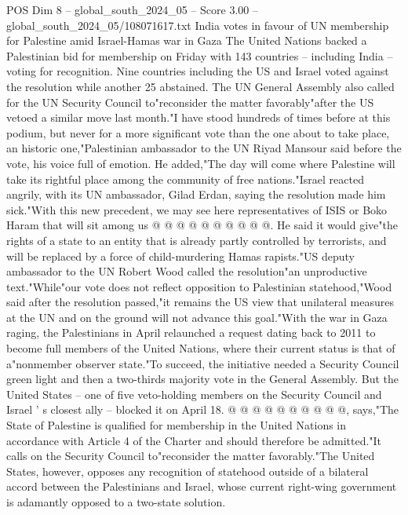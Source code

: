 \begin{textsample}{POS Dim 8 – global\_south\_2024\_05 – Score 3.00 – global\_south\_2024\_05/108071617.txt}  \label{ex:f8_pos_346}
India votes in favour of UN membership for Palestine amid Israel-Hamas war in Gaza The United Nations backed a Palestinian bid for membership on Friday with 143 countries -- including India -- voting for recognition.
Nine countries including the US and Israel voted against the resolution while another 25 abstained.
The UN General Assembly also called for the UN Security Council to"reconsider the matter favorably"after the US vetoed a similar move last month."I have stood hundreds of times before at this podium, but never for a more significant vote than the one about to take place, an historic one,"Palestinian ambassador to the UN Riyad Mansour said before the vote, his voice full of emotion.
He added,"The day will come where Palestine will take its rightful place among the community of free nations."Israel reacted angrily, with its UN ambassador, Gilad Erdan, saying the resolution made him sick."With this new precedent, we may see here representatives of ISIS or Boko Haram that will sit among us @ @ @ @ @ @ @ @ @ @.
He said it would give"the rights of a state to an entity that is already partly controlled by terrorists, and will be replaced by a force of child-murdering Hamas rapists."US deputy ambassador to the UN Robert Wood called the resolution"an unproductive text."While"our vote does not reflect opposition to Palestinian statehood,"Wood said after the resolution passed,"it remains the US view that unilateral measures at the UN and on the ground will not advance this goal."With the war in Gaza raging, the Palestinians in April relaunched a request dating back to 2011 to become full members of the United Nations, where their current status is that of a"nonmember observer state."To succeed, the initiative needed a Security Council green light and then a two-thirds majority vote in the General Assembly.
But the United States -- one of five veto-holding members on the Security Council and Israel ' s closest ally -- blocked it on April 18. @ @ @ @ @ @ @ @ @ @, says,"The State of Palestine is qualified for membership in the United Nations in accordance with Article 4 of the Charter and should therefore be admitted."It calls on the Security Council to"reconsider the matter favorably."The United States, however, opposes any recognition of statehood outside of a bilateral accord between the Palestinians and Israel, whose current right-wing government is adamantly opposed to a two-state solution.

\end{textsample}
